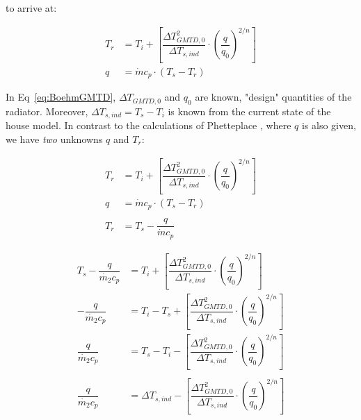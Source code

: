 to arrive at:

\begin{equation}
	\begin{aligned}
		T_{r} &= T_i + \left[\dfrac{\Delta T_{GMTD,0}^2}{\Delta T_{s,ind}} \cdot \left(\dfrac{q}{q_0}\right)^{2/n}\right] \\
		q &= \dot{m} c_p \cdot (T_s - T_r)
	\end{aligned}
	\label{eq:BoehmGMTD}
\end{equation}


In Eq~\ref{eq:BoehmGMTD}, $\Delta T_{GMTD,0}$ and $q_0$ are known, "design" quantities of the radiator. Moreover, $ \Delta T_{s,ind} = T_s - T_i $ is known from the current state of the house model. In contrast to the calculations of Phetteplace \cite{}, where $q$ is also given, we have \emph{two} unknowns $q$ and $T_r$:

\begin{equation}
	\begin{aligned}
		T_{r} &= T_i + \left[\dfrac{\Delta T_{GMTD,0}^2}{\Delta T_{s,ind}} \cdot \left(\dfrac{q}{q_0}\right)^{2/n}\right] \\
		q &= \dot{m} c_p \cdot (T_s - T_r) \\
		\\
		T_{r} &= T_s -\dfrac{q}{\dot{m} c_p}
	\end{aligned}
	\label{eq:PPGMTD}
\end{equation}

\begin{equation}
	\begin{aligned}
		T_s -\dfrac{q}{\dot{m_2} c_p} &= T_i + \left[\dfrac{\Delta T_{GMTD,0}^2}{\Delta T_{s,ind}} \cdot \left(\dfrac{q}{q_0}\right)^{2/n}\right] \\
		-\dfrac{q}{\dot{m_2} c_p} &= T_i - T_s + \left[\dfrac{\Delta T_{GMTD,0}^2}{\Delta T_{s,ind}} \cdot \left(\dfrac{q}{q_0}\right)^{2/n}\right]  \\
		\dfrac{q}{\dot{m_2} c_p} &= T_s - T_i - \left[\dfrac{\Delta T_{GMTD,0}^2}{\Delta T_{s,ind}} \cdot \left(\dfrac{q}{q_0}\right)^{2/n}\right]  \\
		\\
		\dfrac{q}{\dot{m_2} c_p} &= \Delta T_{s,ind} - \left[\dfrac{\Delta T_{GMTD,0}^2}{\Delta T_{s,ind}} \cdot \left(\dfrac{q}{q_0}\right)^{2/n}\right]  \\
	\end{aligned}
	\label{eq:PPGMTD}
\end{equation}

